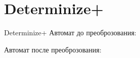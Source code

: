\section{Determinize+}
\begin{frame}{Determinize+}
	Автомат до преоброзования:


	Автомат после преоброзования:

\end{frame}
